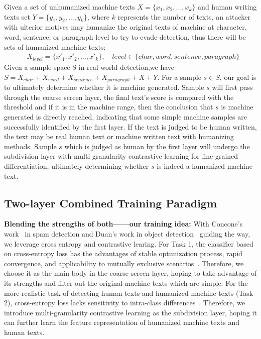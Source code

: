 \documentclass[11pt]{article}
\newcommand{\greenCitep}[1]{\textcolor{darkgreen}{\citep{#1}}}
\begin{document}
	Given a set of unhumanized machine texts $X=\{x_1,x_2,...,x_k\}$ and human writing texts set $Y=\{y_1,y_2,...,y_k\}$, where $k$ represents the number of texts, an attacker with ulterior motives may humanize the original texts of machine at character, word, sentence, or paragraph level to try to evade detection, thus there will be sets of humanized machine texts:\\
  $$
\begin{aligned}
&X_{level} = \{x'_{1}, x'_{2}, \dots, x'_{k}\} ,\quad level \in \{char,word,sentence,paragraph\}
\end{aligned}
$$
	Given a sample space S in real world detection,we have $S = X_{char} + X_{word} + X_{sentence} + X_{paragraph} + X + Y$. For a sample $s \in S$, our goal is to ultimately determine whether it is machine generated. Sample $s$ will first pass through the coarse screen layer, the final text's score is compared with the threshold and if it is in the machine range, then the conclusion that $s$ is machine generated is directly reached, indicating that some simple machine samples are successfully identified by the first layer. If the text is judged to be human written, the text may be real human text or machine written text with humanizing methods. Sample $s$ which is judged as human by the first layer will undergo the subdivision layer with multi-granularity contrastive learning for fine-grained differentiation, ultimately determining whether $s$ is indeed a humanized machine text.
	
	\subsection{Two-layer Combined Training Paradigm}
	\textbf{Blending the strengths of both——our training idea:} With Concone's work~\greenCitep{Concone2023SpADe} in spam detection and Duan's work in object detection~\greenCitep{duan2020corner} guiding the way, we leverage cross entropy and contrastive learing. For Task 1, the classifier based on cross-entropy loss has the advantages of stable optimization process, rapid convergence, and applicability to mutually exclusive scenarios~\greenCitep{Dickson2022crossentry,ma2022crossentry,wood2022biasvariance}. Therefore, we choose it as the main body in the coarse screen layer, hoping to take advantage of its strengths and filter out the original machine texts which are simple. For the more realistic task of detecting human texts and humanized machine texts (Task 2), cross-entropy loss lacks sensitivity to intra-class differences~\greenCitep{liu2016largemarginsoftmax,Sun2020circleloss}. Therefore, we introduce multi-granularity contrastive learning as the subdivision layer, hoping it can further learn the feature representation of humanized machine texts and human texts.
\end{document}
